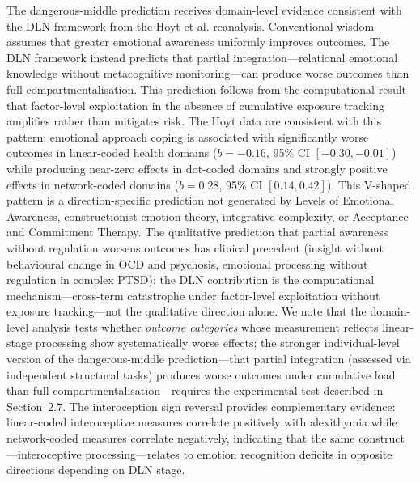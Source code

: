 \documentclass[11pt]{article}
\begin{document}
The dangerous-middle prediction receives domain-level evidence
consistent with the DLN framework from the Hoyt et
al.\cite{Hoyt2024} reanalysis. Conventional wisdom assumes that
greater emotional awareness uniformly improves outcomes. The DLN
framework instead predicts that partial integration---relational
emotional knowledge without metacognitive monitoring---can produce worse
outcomes than full compartmentalisation. This prediction follows from
the computational result that factor-level exploitation in the absence
of cumulative exposure tracking amplifies rather than mitigates
risk\cite{Wu2026}. The Hoyt data are consistent with this pattern:
emotional approach coping is associated with significantly worse
outcomes in linear-coded health domains ($b = -0.16$, 95\% CI
$[-0.30, -0.01]$) while producing near-zero effects in dot-coded
domains and strongly positive effects in network-coded domains
($b = 0.28$, 95\% CI $[0.14, 0.42]$). This V-shaped pattern is a direction-specific
prediction not generated by Levels of Emotional
Awareness\cite{Lane1987}, constructionist emotion
theory\cite{Barrett2017}, integrative complexity\cite{Suedfeld1976,
Tetlock1983}, or Acceptance and Commitment Therapy\cite{Hayes2006}.
The qualitative prediction that partial awareness without regulation
worsens outcomes has clinical precedent (insight without behavioural
change in OCD and psychosis, emotional processing without regulation
in complex PTSD); the DLN contribution is the computational
mechanism---cross-term catastrophe under factor-level exploitation
without exposure tracking---not the qualitative direction alone.
We note that the domain-level analysis tests whether \textit{outcome
categories} whose measurement reflects linear-stage processing show
systematically worse effects; the stronger individual-level version
of the dangerous-middle prediction---that partial integration (assessed
via independent structural tasks) produces worse outcomes under
cumulative load than full compartmentalisation---requires the
experimental test described in Section~2.7.
The interoception sign reversal provides complementary evidence:
linear-coded interoceptive measures correlate positively with
alexithymia while network-coded measures correlate negatively,
indicating that the same construct---interoceptive processing---relates
to emotion recognition deficits in opposite directions depending on
DLN stage.
\end{document}
